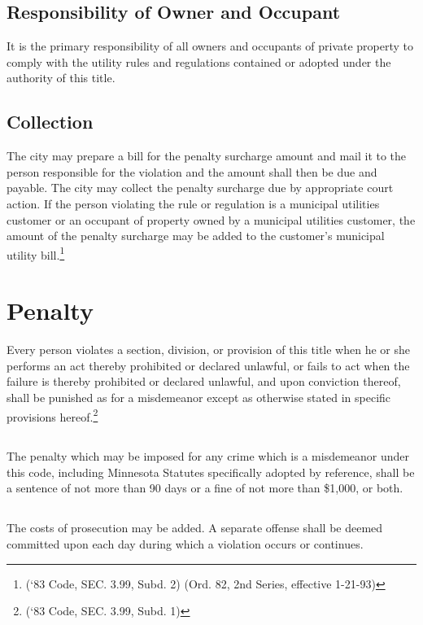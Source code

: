 \subsection{Responsibility of Owner and Occupant}
It is the primary responsibility of all owners and occupants of private property to comply with the utility rules and regulations contained or adopted under the authority of this title.
\subsection{Collection}
The city may prepare a bill for the penalty surcharge amount and mail it to the person responsible for the violation and the amount shall then be due and payable.  The city may collect the penalty surcharge due by appropriate court action.  If the person violating the rule or regulation is a municipal utilities customer or an occupant of property owned by a municipal utilities customer, the amount of the penalty surcharge may be added to the customer’s municipal utility bill.\footnote{(‘83 Code, SEC. 3.99, Subd. 2) (Ord. 82, 2nd Series, effective 1-21-93)}
\section{Penalty}
Every person violates a section, division, or provision of this title when he or she performs an act thereby prohibited or declared unlawful, or fails to act when the failure is thereby prohibited or declared unlawful, and upon conviction thereof, shall be punished as for a misdemeanor except as otherwise stated in specific provisions hereof.\footnote{(‘83 Code, SEC. 3.99, Subd. 1)}
\subsection{}
The penalty which may be imposed for any crime which is a misdemeanor under this code, including Minnesota Statutes specifically adopted by reference, shall be a sentence of not more than 90 days or a fine of not more than \$1,000, or both.
\subsection{}
The costs of prosecution may be added.  A separate offense shall be deemed committed upon each day during which a violation occurs or continues.
